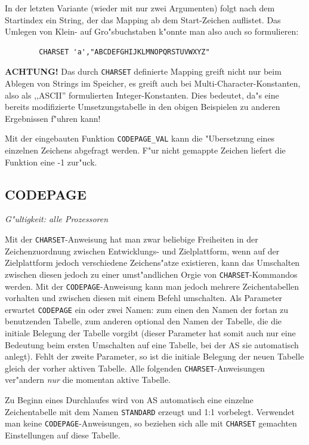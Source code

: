 \documentclass[12pt,a4paper,twoside]{report}
\makeatletter
\newcommand{\bb}[1]{{\bf #1}}
\newcommand{\tty}[1]{{\tt #1}}
\newcommand{\ttindex}[1]{\index{#1@{\tt #1}}}
\newcommand{\asname}{AS}
\makeatother
\begin{document}
In der letzten Variante (wieder mit nur zwei Argumenten) folgt nach dem
Startindex ein String, der das Mapping ab dem Start-Zeichen auflistet.
Das Umlegen von Klein- auf Gro"sbuchstaben k"onnte man also auch so
formulieren:
\begin{verbatim}
        CHARSET 'a',"ABCDEFGHIJKLMNOPQRSTUVWXYZ"
\end{verbatim}

\bb{ACHTUNG!} Das durch \tty{CHARSET} definierte Mapping greift nicht nur
beim Ablegen von Strings im Speicher, es greift auch bei Multi-Character-Konstanten,
also als ,,ASCII'' formulierten Integer-Konstanten.  Dies bedeutet, da"s
eine bereits modifizierte Umsetzungstabelle in den obigen Beispielen zu
anderen Ergebnissen f"uhren kann!

Mit der eingebauten Funktion \tty{CODEPAGE\_VAL} kann die "Ubersetzung
eines einzelnen Zeichens abgefragt werden.  F"ur nicht gemappte Zeichen
liefert die Funktion eine -1 zur"uck.


\subsection{CODEPAGE}
\ttindex{CODEPAGE}

{\em G"ultigkeit: alle Prozessoren}

Mit der \tty{CHARSET}-Anweisung hat man zwar beliebige Freiheiten in der
Zeichenzuordnung zwischen Entwicklungs- und Zielplattform, wenn auf der
Zielplattform jedoch verschiedene Zeichens"atze existieren, kann das
Umschalten zwischen diesen jedoch zu einer umst"andlichen Orgie von
\tty{CHARSET}-Kommandos werden.  Mit der \tty{CODEPAGE}-Anweisung kann
man jedoch mehrere Zeichentabellen vorhalten und zwischen diesen mit einem
Befehl umschalten.  Als Parameter erwartet \tty{CODEPAGE} ein oder zwei
Namen: zum einen den Namen der fortan zu benutzenden Tabelle, zum anderen
optional den Namen der Tabelle, die die initiale Belegung der Tabelle
vorgibt (dieser Parameter hat somit auch nur eine Bedeutung beim ersten
Umschalten auf eine Tabelle, bei der \asname{} sie automatisch anlegt).  Fehlt
der zweite Parameter, so ist die initiale Belegung der neuen Tabelle
gleich der vorher aktiven Tabelle.  Alle folgenden
\tty{CHARSET}-Anweisungen ver"andern {\em nur} die momentan aktive Tabelle.

Zu Beginn eines Durchlaufes wird von \asname{} automatisch eine einzelne
Zeichentabelle mit dem Namen \tty{STANDARD} erzeugt und 1:1 vorbelegt.
Verwendet man keine \tty{CODEPAGE}-Anweisungen, so beziehen sich alle mit
\tty{CHARSET} gemachten Einstellungen auf diese Tabelle.
\end{document}
